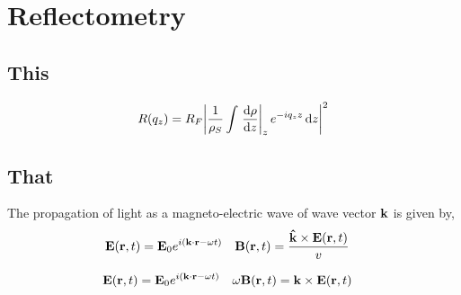 



\section{Reflectometry} %
\label{sec:reflectometry}

\subsection{This} %
\label{sub:this}

\begin{align*}
	R\pqty{q_z} = R_F\abs{\frac{1}{\rho_S}\int \eval{\dv{\rho}{z}}_z e^{-iq_z z}\dd{z}}^2
\end{align*}


\subsection{That} %
\label{sub:that}


The propagation of light as a magneto-electric wave of wave vector $\vb{k}$ is given by,
\begin{align*}
	\vb{E}\pqty{\vb{r},t} & = \vb{E}_{0}e^{i\pqty{\vb{k}\cdot\vb{r} - \omega t}} & \vb{B}\pqty{\vb{r},t} & = \frac{\vu{k}\times\vb{E}\pqty{\vb{r},t}}{v}
\end{align*}

\begin{align*}
	\vb{E}\pqty{\vb{r},t} & = \vb{E}_{0}e^{i\pqty{\vb{k}\cdot\vb{r} - \omega t}} & \omega \vb{B}\pqty{\vb{r},t} & = \vb{k}\times\vb{E}\pqty{\vb{r},t}
\end{align*}

